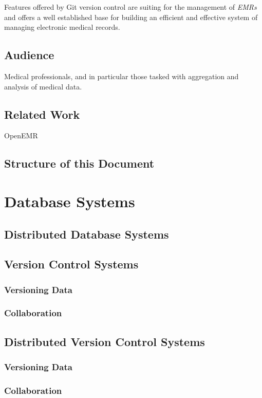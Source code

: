 \documentclass{acm_proc_article-sp}
\begin{document}
Features offered by Git version control are suiting for the management of \textit{EMRs} and 
offers a well established base for building an efficient and effective system of managing
electronic medical records.

\subsection{Audience}
Medical professionals, and in particular those tasked with aggregation and analysis of medical data.

\subsection{Related Work}
OpenEMR


\subsection{Structure of this Document}

\section{Database Systems}

\subsection{Distributed Database Systems}
\subsection{Version Control Systems}
\subsubsection{Versioning Data}
\subsubsection{Collaboration}
\subsection{Distributed Version Control Systems}
\subsubsection{Versioning Data}
\subsubsection{Collaboration}
\end{document}
